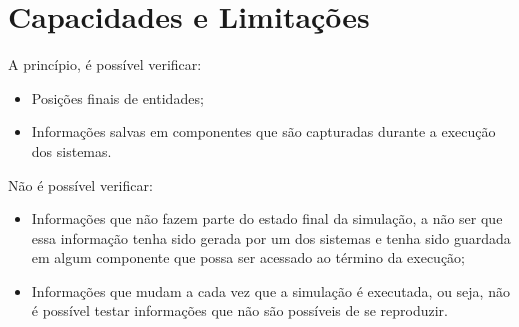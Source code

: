 \section{Capacidades e Limitações}
\label{sec:limitacoesTeste}
A princípio, é possível verificar:
\begin{itemize}
    \item Posições finais de entidades;
    \item Informações salvas em componentes que são capturadas durante a execução dos sistemas.
\end{itemize}

Não é possível verificar:
\begin{itemize}
    \item Informações que não fazem parte do estado final  da simulação, a não ser que essa informação tenha sido gerada por um dos sistemas e tenha sido guardada em algum componente que possa ser acessado ao término da execução;
    \item Informações que mudam a cada vez que a simulação é executada, ou seja, não é possível testar informações que não são possíveis de se reproduzir.
\end{itemize}


